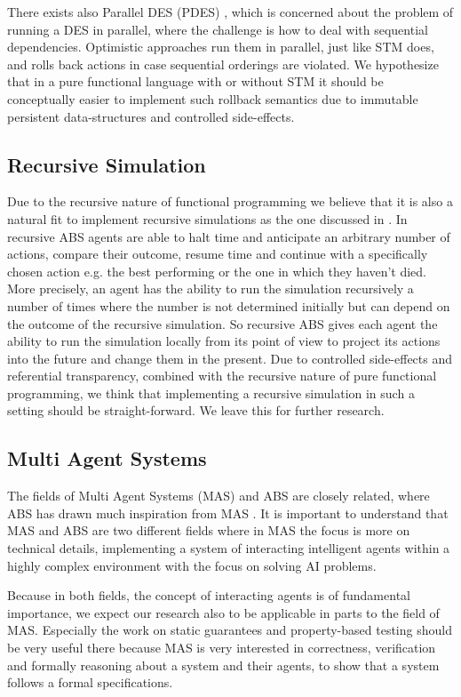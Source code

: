 There exists also Parallel DES (PDES) \cite{fujimoto_parallel_2017}, which is concerned about the problem of running a DES in parallel, where the challenge is how to deal with sequential dependencies. Optimistic approaches run them in parallel, just like STM does, and rolls back actions in case sequential orderings are violated. We hypothesize that in a pure functional language with or without STM it should be conceptually easier to implement such rollback semantics due to immutable persistent data-structures and controlled side-effects.
 
\subsection{Recursive Simulation}
Due to the recursive nature of functional programming we believe that it is also a natural fit to implement recursive simulations as the one discussed in \cite{gilmer_recursive_2000}. In recursive ABS agents are able to halt time and anticipate an arbitrary number of actions, compare their outcome, resume time and continue with a specifically chosen action e.g. the best performing or the one in which they haven't died. More precisely, an agent has the ability to run the simulation recursively a number of times where the number is not determined initially but can depend on the outcome of the recursive simulation. So recursive ABS gives each agent the ability to run the simulation locally from its point of view to project its actions into the future and change them in the present. Due to controlled side-effects and referential transparency, combined with the recursive nature of pure functional programming, we think that implementing a recursive simulation in such a setting should be straight-forward. We leave this for further research.

\subsection{Multi Agent Systems}
The fields of Multi Agent Systems (MAS) and ABS are closely related, where ABS has drawn much inspiration from MAS \cite{weiss_multiagent_2013,wooldridge_introduction_2009}. It is important to understand that MAS and ABS are two different fields where in MAS the focus is more on technical details, implementing a system of interacting intelligent agents within a highly complex environment with the focus on solving AI problems.

Because in both fields, the concept of interacting agents is of fundamental importance, we expect our research also to be applicable in parts to the field of MAS. Especially the work on static guarantees and property-based testing should be very useful there because MAS is very interested in correctness, verification and formally reasoning about a system and their agents, to show that a system follows a formal specifications.